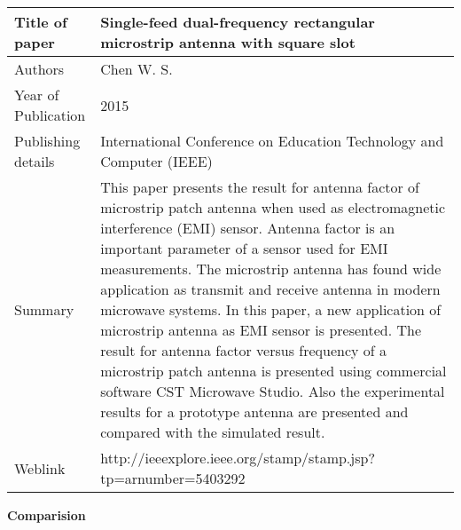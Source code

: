 \documentclass[12pt]{article}
\begin{document}
		       \begin{center}
		       	\begin{table}[H]
		       		\centering
		       		\begin{tabular}{ |l|p{11cm}| }
		       			\hline
		       			Title of paper &  Single-feed dual-frequency rectangular microstrip antenna with square slot \\
		       			\hline
		       			Authors & Chen W. S. \\
		       			\hline
		       			Year of Publication & 2015 \\
		       			\hline
		       			Publishing details & International Conference on Education Technology and Computer (IEEE) \\ \hline
		       			Summary & This paper presents the result for antenna factor of microstrip patch antenna when used as electromagnetic interference (EMI) sensor. Antenna factor is an important parameter of a sensor used for EMI measurements. The microstrip antenna has found wide application as transmit and receive antenna in modern microwave systems. In this paper, a new application of microstrip antenna as EMI sensor is presented. The result for antenna factor versus frequency of a microstrip patch antenna is presented using commercial software CST Microwave Studio. Also the experimental results for a prototype antenna are presented and compared with the simulated result.\\
		       			\hline
		       			Weblink & http://ieeexplore.ieee.org/stamp/stamp.jsp?tp=arnumber=5403292 \\
		       			\hline			 
		       		\end{tabular}		
		       		
		       	\end{table}
		       \end{center}		 
		
		\cleardoublepage
		
			\begin{flushleft}
				\textbf{Comparision}
			\end{flushleft}
			
\end{document}
